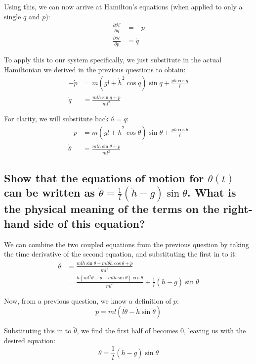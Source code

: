 \documentclass[a4paper]{scrartcl}
\begin{document}
Using this, we can now arrive at Hamilton's equations (when applied to only a single \(q\) and \(p\)):
\begin{align*}
    \frac{\partial \mathcal{H}}{\partial q} &= -\dot{p} \\
    \frac{\partial \mathcal{H}}{\partial p} &= \dot{q}
\end{align*}

To apply this to our system specifically, we just substitute in the actual Hamiltonian we derived in the previous questions to obtain:
\begin{align*}
    -\dot{p} &= m \left(g l + \dot{h}^2 \cos q\right) \sin q + \frac{p \dot{h} \cos q}{l} \\
    \dot{q} &= \frac{m l \dot{h} \sin q + p}{m l^2}
\end{align*}

For clarity, we will substitute back \(\theta = q\):
\begin{align*}
    -\dot{p} &= m \left(g l + \dot{h}^2 \cos \theta\right) \sin \theta + \frac{p \dot{h} \cos \theta}{l} \\
    \dot{\theta} &= \frac{m l \dot{h} \sin \theta + p}{m l^2}
\end{align*}

\subsection{Show that the equations of motion for \(\theta(t)\) can be written as \(\ddot{\theta} = \frac{1}{l} \left(\ddot{h} - g\right) \sin \theta\). What is the physical meaning of the terms on the right-hand side of this equation?}
We can combine the two coupled equations from the previous question by taking the time derivative of the second equation, and substituting the first in to it:
\begin{align*}
    \ddot{\theta} &= \frac{m l \ddot{h} \sin \theta + m l \dot{\theta} \dot{h} \cos \theta + \dot{p}}{m l^2} \\
    &= \frac{\dot{h} \left(m l^2 \dot{\theta} - p + m l \dot{h} \sin \theta\right) \cos \theta}{m l^3} + \frac{1}{l} \left(\ddot{h} - g\right) \sin \theta
\end{align*}

Now, from a previous question, we know a definition of \(p\):
\[p = m l \left(l \dot{\theta} - \dot{h} \sin \theta\right)\]

Substituting this in to \(\ddot{\theta}\), we find the first half of becomes 0, leaving us with the desired equation:
\[\ddot{\theta} = \frac{1}{l} \left(\ddot{h} - g\right) \sin \theta\]
\end{document}
